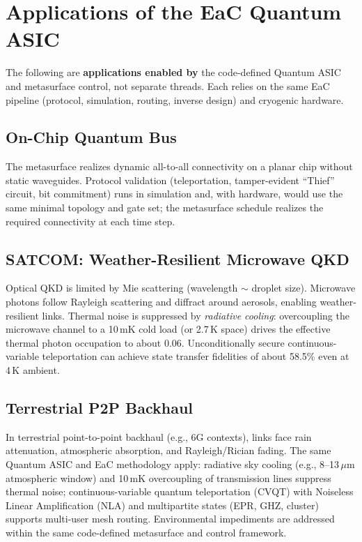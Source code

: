 \documentclass[11pt, a4paper]{article}
\begin{document}
\section{Applications of the EaC Quantum ASIC}

The following are \textbf{applications enabled by} the code-defined Quantum ASIC and metasurface control, not separate threads. Each relies on the same EaC pipeline (protocol, simulation, routing, inverse design) and cryogenic hardware.

\subsection{On-Chip Quantum Bus}

The metasurface realizes dynamic all-to-all connectivity on a planar chip without static waveguides. Protocol validation (teleportation, tamper-evident ``Thief'' circuit, bit commitment) runs in simulation and, with hardware, would use the same minimal topology and gate set; the metasurface schedule realizes the required connectivity at each time step.

\subsection{SATCOM: Weather-Resilient Microwave QKD}

Optical QKD is limited by Mie scattering (wavelength $\sim$ droplet size). Microwave photons follow Rayleigh scattering and diffract around aerosols, enabling weather-resilient links. Thermal noise is suppressed by \emph{radiative cooling}: overcoupling the microwave channel to a 10\,mK cold load (or 2.7\,K space) drives the effective thermal photon occupation to about 0.06. Unconditionally secure continuous-variable teleportation can achieve state transfer fidelities of about 58.5\% even at 4\,K ambient.

\subsection{Terrestrial P2P Backhaul}

In terrestrial point-to-point backhaul (e.g., 6G contexts), links face rain attenuation, atmospheric absorption, and Rayleigh/Rician fading. The same Quantum ASIC and EaC methodology apply: radiative sky cooling (e.g., 8--13\,$\mu$m atmospheric window) and 10\,mK overcoupling of transmission lines suppress thermal noise; continuous-variable quantum teleportation (CVQT) with Noiseless Linear Amplification (NLA) and multipartite states (EPR, GHZ, cluster) supports multi-user mesh routing. Environmental impediments are addressed within the same code-defined metasurface and control framework.
\end{document}
